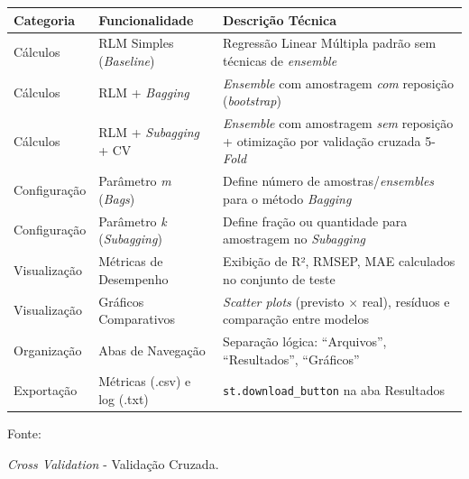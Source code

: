 \begin{quadro}[ht]
\begin{center}
\small
\captionsetup{justification=centering, labelsep=endash, width=0.75\linewidth}
\caption{Inventário das funções do sistema.}
\label{tab:funcoes}
\begin{threeparttable}
\begin{tabularx}{\textwidth}{|l|l|X|} \hline
\textbf{Categoria} & \textbf{Funcionalidade} & \textbf{Descrição Técnica} \\ \hline
Cálculos & RLM Simples (\textit{Baseline}) & Regressão Linear Múltipla padrão sem técnicas de \textit{ensemble} \\ \hline
Cálculos & RLM + \textit{Bagging} & \textit{Ensemble} com amostragem \textit{com} reposição (\textit{bootstrap}) \\ \hline
Cálculos & RLM + \textit{Subagging} + CV\tnote{a} & \textit{Ensemble} com amostragem \textit{sem} reposição + otimização por validação cruzada 5-\textit{Fold} \\ \hline
Configuração & Parâmetro \textit{m} (\textit{Bags}) & Define número de amostras/\textit{ensembles} para o método \textit{Bagging} \\ \hline
Configuração & Parâmetro \textit{k} (\textit{Subagging}) & Define fração ou quantidade para amostragem no \textit{Subagging} \\ \hline
Visualização & Métricas de Desempenho & Exibição de R², RMSEP, MAE calculados no conjunto de teste \\ \hline
Visualização & Gráficos Comparativos & \textit{Scatter plots} (previsto $\times$ real), resíduos e comparação entre modelos \\ \hline
Organização & Abas de Navegação & Separação lógica: ``Arquivos'', ``Resultados'', ``Gráficos'' \\ \hline
Exportação & Métricas (.csv) e log (.txt) & \texttt{st.download\_button} na aba Resultados \\ \hline
\end{tabularx}
\begin{tablenotes}[flushleft]
\footnotesize
\item Fonte:~\oautor
\item[a] \textit{Cross Validation }- Validação Cruzada.
\end{tablenotes}
\end{threeparttable}
\end{center}
\end{quadro}


